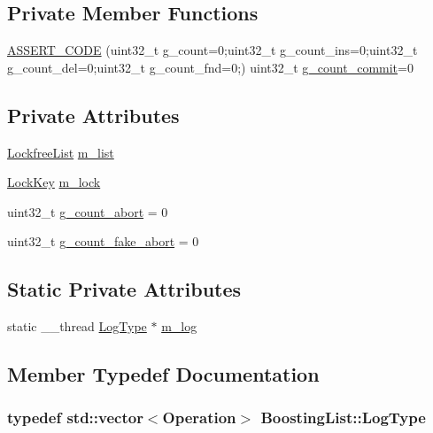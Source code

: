 \subsection*{Private Member Functions}
\begin{DoxyCompactItemize}
\item 
\hyperlink{classBoostingList_a311091c9feae89d6c7a7c1c01cb7502a}{A\-S\-S\-E\-R\-T\-\_\-\-C\-O\-D\-E} (uint32\-\_\-t g\-\_\-count=0;uint32\-\_\-t g\-\_\-count\-\_\-ins=0;uint32\-\_\-t g\-\_\-count\-\_\-del=0;uint32\-\_\-t g\-\_\-count\-\_\-fnd=0;) uint32\-\_\-t \hyperlink{transskip_8cc_a31e805bc19e3448a48adec9322bbb28a}{g\-\_\-count\-\_\-commit}=0
\end{DoxyCompactItemize}
\subsection*{Private Attributes}
\begin{DoxyCompactItemize}
\item 
\hyperlink{classLockfreeList}{Lockfree\-List} \hyperlink{classBoostingList_a2050d7b396704887ab33cdeabaa48dae}{m\-\_\-list}
\item 
\hyperlink{classLockKey}{Lock\-Key} \hyperlink{classBoostingList_a6f740d1ae0796e5189304db843a51f65}{m\-\_\-lock}
\item 
uint32\-\_\-t \hyperlink{classBoostingList_a1959338dbec4dff7dde70241c1b55178}{g\-\_\-count\-\_\-abort} = 0
\item 
uint32\-\_\-t \hyperlink{classBoostingList_ab25416a1dae12a3674ebbf6195182675}{g\-\_\-count\-\_\-fake\-\_\-abort} = 0
\end{DoxyCompactItemize}
\subsection*{Static Private Attributes}
\begin{DoxyCompactItemize}
\item 
static \-\_\-\-\_\-thread \hyperlink{classBoostingList_aff446bc12b9d63259726601a952d8479}{Log\-Type} $\ast$ \hyperlink{classBoostingList_a53dd78138a275866cd2586ed933af9d4}{m\-\_\-log}
\end{DoxyCompactItemize}


\subsection{Member Typedef Documentation}
\hypertarget{classBoostingList_aff446bc12b9d63259726601a952d8479}{
\subsubsection[{Log\-Type}]{\setlength{\rightskip}{0pt plus 5cm}typedef std\-::vector$<${\bf Operation}$>$ {\bf Boosting\-List\-::\-Log\-Type}\hspace{0.3cm}{\ttfamily [private]}}}\label{classBoostingList_aff446bc12b9d63259726601a952d8479}


